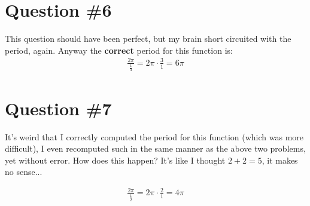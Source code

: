 \section*{Question \#6}

This question should have been perfect, but my brain short circuited with the period, again. Anyway the \textbf{correct} period for this function is:
\begin{equation}
\begin{split}
\frac{2\pi}{\frac{1}{3}} = 2\pi \cdot \frac{3}{1} = 6\pi
\end{split}
\end{equation}


\section*{Question \#7}

It's weird that I correctly computed the period for this function (which was more difficult), I even recomputed such in the same manner as the above two problems, yet without error. How does this happen? It's like I thought $2+2 = 5$, it makes no sense... 


\begin{equation}
\begin{split}
\frac{2\pi}{\frac{1}{2}} = 2\pi \cdot \frac{2}{1} = 4\pi
\end{split}
\end{equation}



